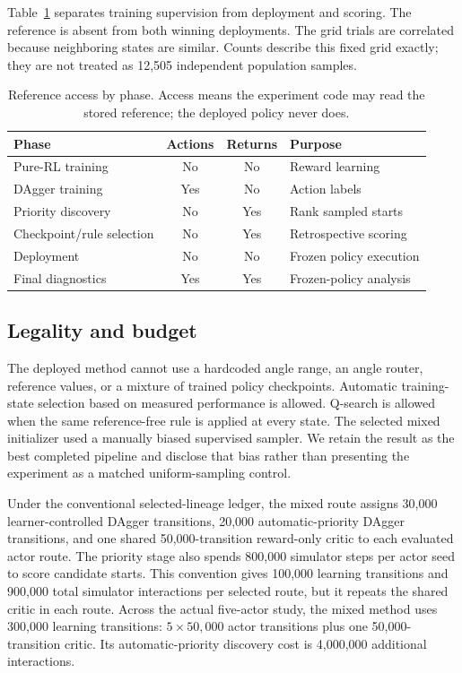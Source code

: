 \documentclass[10pt,twocolumn]{article}
\begin{document}
Table~\ref{tab:reference-access} separates training supervision from deployment and scoring. The reference is absent from both winning deployments. The grid trials are correlated because neighboring states are similar. Counts describe this fixed grid exactly; they are not treated as 12,505 independent population samples.

\begin{table}[h]
\centering
\scriptsize
\caption{Reference access by phase. Access means the experiment code may read the stored reference; the deployed policy never does.}
\label{tab:reference-access}
\begin{tabularx}{\columnwidth}{>{\raggedright\arraybackslash}Xcc>{\raggedright\arraybackslash}p{24mm}}
\toprule
Phase & Actions & Returns & Purpose\\
\midrule
Pure-RL training & No & No & Reward learning\\
DAgger training & Yes & No & Action labels\\
Priority discovery & No & Yes & Rank sampled starts\\
Checkpoint/rule selection & No & Yes & Retrospective scoring\\
Deployment & No & No & Frozen policy execution\\
Final diagnostics & Yes & Yes & Frozen-policy analysis\\
\bottomrule
\end{tabularx}
\end{table}

\subsection{Legality and budget}

The deployed method cannot use a hardcoded angle range, an angle router, reference values, or a mixture of trained policy checkpoints. Automatic training-state selection based on measured performance is allowed. Q-search is allowed when the same reference-free rule is applied at every state. The selected mixed initializer used a manually biased supervised sampler. We retain the result as the best completed pipeline and disclose that bias rather than presenting the experiment as a matched uniform-sampling control.

Under the conventional selected-lineage ledger, the mixed route assigns 30,000 learner-controlled DAgger transitions, 20,000 automatic-priority DAgger transitions, and one shared 50,000-transition reward-only critic to each evaluated actor route. The priority stage also spends 800,000 simulator steps per actor seed to score candidate starts. This convention gives 100,000 learning transitions and 900,000 total simulator interactions per selected route, but it repeats the shared critic in each route. Across the actual five-actor study, the mixed method uses 300,000 learning transitions: $5\times50,000$ actor transitions plus one 50,000-transition critic. Its automatic-priority discovery cost is 4,000,000 additional interactions.
\end{document}
